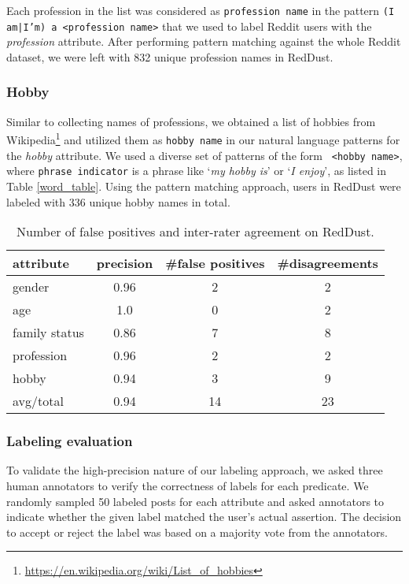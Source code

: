 Each profession in the list was considered as \texttt{\small profession name} in the pattern \texttt{\small (I am|I'm) a <profession name>} that we used to label Reddit users with the \emph{profession} attribute.
After performing pattern matching against the whole Reddit dataset, we were left with 832 unique profession names in RedDust.

\subsubsection{Hobby}
Similar to collecting names of professions, we obtained a list of hobbies from Wikipedia\footnote{ \href{https://en.wikipedia.org/wiki/List_of_hobbies}{https://en.wikipedia.org/wiki/List\_of\_hobbies}} and 
utilized them as \texttt{\small hobby name} in our natural language patterns for the \emph{hobby} attribute.
We used a diverse set of patterns of the form \texttt{ <hobby name>}, where \texttt{\small phrase indicator} is a phrase like `\textit{my hobby is}' or `\textit{I enjoy}', as listed in Table \ref{word_table}. 
Using the pattern matching approach, users in RedDust were labeled with 336 unique hobby names in total.

\begin{table}[h!]\sffamily
\centering
\small
\begin{adjustbox}{width=0.6\textwidth}
\begin{tabular}{lccc}
\toprule
\textbf{attribute} & \textbf{precision} & \textbf{\#false positives} & \textbf{\#disagreements} \\
\midrule
gender & 0.96 & 2 & 2 \\
age & 1.0 & 0 & 2 \\
family status & 0.86 & 7 & 8 \\
profession & 0.96 & 2 & 2 \\
hobby & 0.94 & 3 & 9 \\
\midrule
avg/total & 0.94 & 14 & 23 \\
\bottomrule
\end{tabular}
\end{adjustbox}
\caption{Number of false positives and inter-rater agreement on RedDust.}
\label{agreement}
\end{table}

\subsubsection{Labeling evaluation}
\label{kappa2}
To validate the high-precision nature of our labeling approach, we asked three human annotators 
to verify the correctness of labels for each predicate. We randomly sampled 50 labeled posts for each attribute and asked annotators to indicate whether the given label matched the user's actual assertion. The decision to accept or reject the label was based on a majority vote from the annotators.

